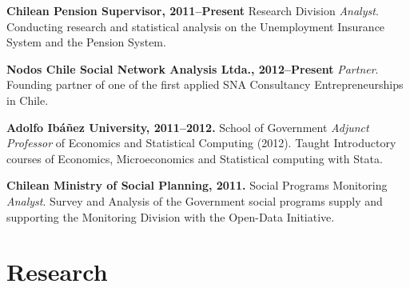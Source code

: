 \documentclass[letterpaper, 11pt]{article}
\renewenvironment{itemize}{
  \begin{list}{}{
    \setlength{\leftmargin}{0.45cm}
  }
}{
  \end{list}
}
\begin{document}
\begin{itemize}
\item \textbf{Chilean Pension Supervisor, 2011--Present} Research Division \emph{Analyst}.
Conducting research and statistical analysis on the Unemployment Insurance System and the Pension System.
\item \textbf{Nodos Chile Social Network Analysis Ltda., 2012--Present} \emph{Partner}.
Founding partner of one of the first applied SNA Consultancy Entrepreneurships in Chile.
\item \textbf{Adolfo Ib\'a\~nez University, 2011--2012.} School of Government \emph{Adjunct Professor} of Economics and Statistical Computing (2012). 
Taught Introductory courses of Economics, Microeconomics and Statistical computing with Stata.
\item \textbf{Chilean Ministry of Social Planning, 2011.} Social Programs Monitoring \emph{Analyst}.
Survey and Analysis of the Government social programs supply and supporting the Monitoring Division with the Open-Data Initiative.
\end{itemize}

\section*{Research}
\end{document}
